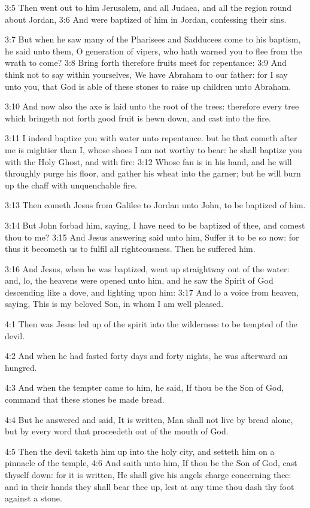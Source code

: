3:5 Then went out to him Jerusalem, and all Judaea, and all the region round about Jordan, 3:6 And were baptized of him in Jordan, confessing their sins.

3:7 But when he saw many of the Pharisees and Sadducees come to his baptism, he said unto them, O generation of vipers, who hath warned you to flee from the wrath to come?  3:8 Bring forth therefore fruits meet for repentance: 3:9 And think not to say within yourselves, We have Abraham to our father: for I say unto you, that God is able of these stones to raise up children unto Abraham.

3:10 And now also the axe is laid unto the root of the trees: therefore every tree which bringeth not forth good fruit is hewn down, and cast into the fire.

3:11 I indeed baptize you with water unto repentance. but he that cometh after me is mightier than I, whose shoes I am not worthy to bear: he shall baptize you with the Holy Ghost, and with fire: 3:12 Whose fan is in his hand, and he will throughly purge his floor, and gather his wheat into the garner; but he will burn up the chaff with unquenchable fire.

3:13 Then cometh Jesus from Galilee to Jordan unto John, to be baptized of him.

3:14 But John forbad him, saying, I have need to be baptized of thee, and comest thou to me?  3:15 And Jesus answering said unto him, Suffer it to be so now: for thus it becometh us to fulfil all righteousness.  Then he suffered him.

3:16 And Jesus, when he was baptized, went up straightway out of the water: and, lo, the heavens were opened unto him, and he saw the Spirit of God descending like a dove, and lighting upon him: 3:17 And lo a voice from heaven, saying, This is my beloved Son, in whom I am well pleased.

4:1 Then was Jesus led up of the spirit into the wilderness to be tempted of the devil.

4:2 And when he had fasted forty days and forty nights, he was afterward an hungred.

4:3 And when the tempter came to him, he said, If thou be the Son of God, command that these stones be made bread.

4:4 But he answered and said, It is written, Man shall not live by bread alone, but by every word that proceedeth out of the mouth of God.

4:5 Then the devil taketh him up into the holy city, and setteth him on a pinnacle of the temple, 4:6 And saith unto him, If thou be the Son of God, cast thyself down: for it is written, He shall give his angels charge concerning thee: and in their hands they shall bear thee up, lest at any time thou dash thy foot against a stone.

